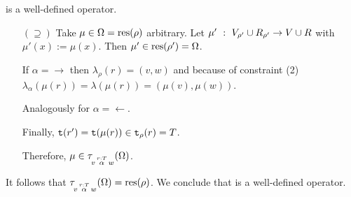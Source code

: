 \begin{definition}
\begin{proofof}{ is a well-defined operator.}
\begin{itemize}
\begin{enumerate}[(1)]
        For $s \in R_\rho, s \not = r$ it holds that
        $\rtype_\rho(s) = \rtype_{\rho'}(s) \ni \rtype(\mu'(s)) = \rtype(\mu(s))$.
      
      \item %
        Take $\{s,t\} \in \rpairs_\rho = \rpairs_{\rho'}$ arbitrary.
        Then $s,t \in R_{\rho'}$ and therefore $\mu(s) = \mu'(s)$ and
        $\mu(t) = \mu'(t)$.
        
        Because $\mu' \in \result(\rho')$ it follows that
        $\mu(s) = \mu'(s) \not = \mu'(t) = \mu(t)$.
    \end{enumerate}
    
    As a result, $\mu \in \result(\rho)$.

  \item[$(\supseteq)$]
    Take $\mu \in \Omega = \text{res}(\rho)$ arbitrary. Let
    $\mu' ~:~ V_{\rho'} \cup R_{\rho'} \rightarrow V \cup R$ with
    $\mu'(x) := \mu(x)$.
    Then $\mu' \in \text{res}(\rho') = \Omega$.
    
    If $\alpha = \rightarrow$
    then $\lambda_\rho(r) = (v, w)$
    and because of constraint (2)
    $\lambda_\alpha(\mu(r)) = \lambda(\mu(r)) = (\mu(v), \mu(w))$.
    
    Analogously for $\alpha = \leftarrow$.
    
    Finally, $\texttt{t}(r') = \texttt{t}(\mu(r)) \in \texttt{t}_\rho(r) = T$.
    
    Therefore, $\mu \in \tau\!_{v\, \overset{r:T}{\alpha} \, w}(\Omega)$.
\end{itemize}

It follows that $\tau\!_{v\, \overset{r:T}{\alpha} \, w}(\Omega) = \text{res}(\rho)$.
We conclude that  is a well-defined operator.
\end{proofof}
\end{definition}



